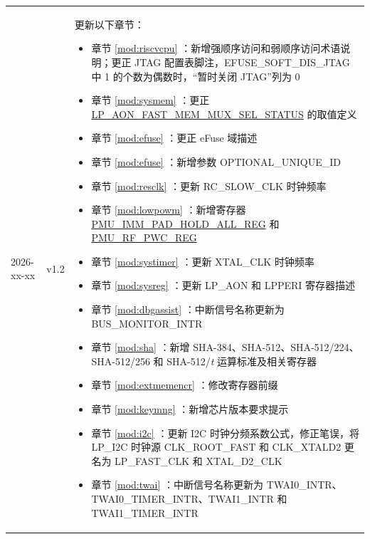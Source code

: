 \begin{longtable}[l]{ | m{2cm} | m{1.5cm} | m{12cm} | }
    2026-xx-xx & v1.2 & 更新以下章节：
    \begin{itemize}
        \item 章节 \ref{mod:riscvcpu} \textit{\nameref{mod:riscvcpu}}：新增强顺序访问和弱顺序访问术语说明；更正 JTAG 配置表脚注，EFUSE\_SOFT\_DIS\_JTAG 中 1 的个数为偶数时，“暂时关闭 JTAG”列为 0 %
        \item 章节 \ref{mod:sysmem} \textit{\nameref{mod:sysmem}}：更正 \hyperref[fielddesc:LPAONFASTMEMMUXSELSTATUS]{LP\_AON\_FAST\_MEM\_MUX\_SEL\_STATUS} 的取值定义 %
        \item 章节 \ref{mod:efuse} \textit{\nameref{mod:efuse}}：更正 eFuse 域描述
        \item 章节 \ref{mod:efuse} \textit{\nameref{mod:efuse}}：新增参数 OPTIONAL\_UNIQUE\_ID %
        \item 章节 \ref{mod:resclk} \textit{\nameref{mod:resclk}}：更新 RC\_SLOW\_CLK 时钟频率 %
        \item 章节 \ref{mod:lowpowm} \textit{\nameref{mod:lowpowm}}：新增寄存器 \hyperref[regdesc:PMUIMMPADHOLDALLREG]{PMU\_IMM\_PAD\_HOLD\_ALL\_REG} 和 \hyperref[regdesc:PMURFPWCREG]{PMU\_RF\_PWC\_REG}
        \item 章节 \ref{mod:systimer} \textit{\nameref{mod:systimer}}：更新 XTAL\_CLK 时钟频率 %
        \item 章节 \ref{mod:sysreg} \textit{\nameref{mod:sysreg}}：更新 LP\_AON 和 LPPERI 寄存器描述 %
        \item 章节 \ref{mod:dbgassist} \textit{\nameref{mod:dbgassist}}：中断信号名称更新为 BUS\_MONITOR\_INTR %
        \item 章节 \ref{mod:sha} \textit{\nameref{mod:sha}}：新增 SHA-384、SHA-512、SHA-512/224、SHA-512/256 和 SHA-512/{\it{t}} 运算标准及相关寄存器
        \item 章节 \ref{mod:extmemencr} \textit{\nameref{mod:extmemencr}}：修改寄存器前缀
        \item 章节 \ref{mod:keymng} \textit{\nameref{mod:keymng}}：新增芯片版本要求提示 %
        \item 章节 \ref{mod:i2c} \textit{\nameref{mod:i2c}}：更新 I2C 时钟分频系数公式，修正笔误，将 LP\_I2C 时钟源 CLK\_ROOT\_FAST 和 CLK\_XTALD2 更名为 LP\_FAST\_CLK 和 XTAL\_D2\_CLK %
        \item 章节 \ref{mod:twai} \textit{\nameref{mod:twai}}：中断信号名称更新为 TWAI0\_INTR、TWAI0\_TIMER\_INTR、TWAI1\_INTR 和 TWAI1\_TIMER\_INTR %

\end{itemize}
\end{longtable}
